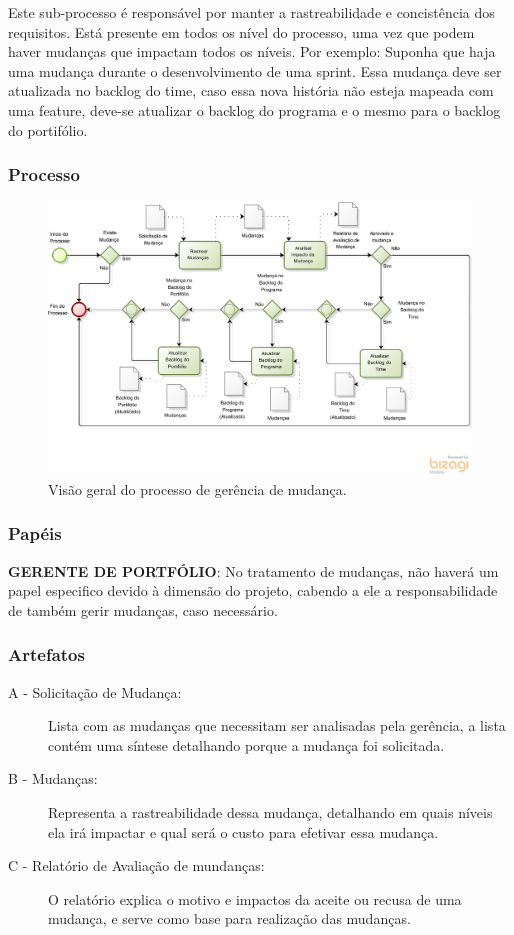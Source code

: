   Este sub-processo é responsável por manter a rastreabilidade e concistência dos requisitos.
  Está presente em todos os nível do processo, uma vez que podem haver mudanças que impactam todos
  os níveis. Por exemplo: Suponha que haja uma mudança durante o desenvolvimento de uma sprint.
  Essa mudança deve ser atualizada no backlog do time, caso essa nova história não esteja mapeada com
  uma feature, deve-se atualizar o backlog do programa e o mesmo para o backlog do portifólio.

\subsubsection{Processo}
  \begin{figure}[H]
      \centering
    \includegraphics[keepaspectratio=true,scale=0.6]{figuras/gerencia.eps}
      \caption{Visão geral do processo de gerência de mudança.}
      \label{fig:gerencia}
  \end{figure}

\subsubsection{Papéis}

  \textbf{GERENTE DE PORTFÓLIO}: No tratamento de mudanças, não haverá um papel especifico devido
à dimensão do projeto, cabendo a ele a responsabilidade de também gerir mudanças, caso necessário.

\subsubsection{Artefatos}

\begin{description}
  \item[A - Solicitação de Mudança: ]
  Lista com as mudanças que necessitam ser analisadas pela gerência, a lista contém
  uma síntese detalhando porque a mudança foi solicitada.
  \item [B - Mudanças: ] Representa a rastreabilidade dessa mudança, detalhando em
  quais níveis ela irá impactar e qual será o custo para efetivar essa mudança.
  \item [C - Relatório de Avaliação de mundanças: ] O relatório explica o motivo e impactos da aceite
  ou recusa de uma mudança, e serve como base para realização das mudanças.
\end{description}

